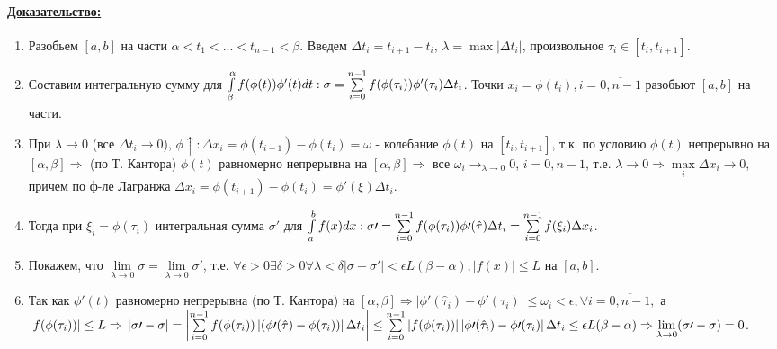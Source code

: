 \documentclass{article}
\begin{document}
	\paragraph{\underline{Доказательство:}}
		\begin{enumerate}

			\item Разобьем $[a,b]$ на части $\alpha<t_1<...<t_{n-1}<\beta$. Введем $\Delta t_i=t_{i+1}-t_i$, $\lambda=\max|\Delta t_i|$, произвольное $\tau_i \in [t_i,t_{i+1}]$.

			\item Составим интегральную сумму для $\int\limits^\alpha_\beta f(\phi(t))\phi^\prime(t)dt: \\
			\sigma=\sum\limits^{n-1}_{i=0}f(\phi(\tau_i))\phi^\prime(\tau_i)\Delta t_i$. Точки $x_i=\phi(t_i), i=\overline{0,n-1}$ разобьют $[a,b]$ на части.

			\item При $\lambda \rightarrow 0$ (все $\Delta t_i \rightarrow 0$), $\phi\uparrow: \Delta x_i=\phi(t_{i+1})-\phi(t_i)=\omega$ - колебание $\phi(t)$ на $[t_i,t_{i+1}]$, т.к. по условию $\phi(t)$ непрерывно на $[\alpha,\beta] \Rightarrow $ (по Т. Кантора) $\phi(t)$ равномерно непрерывна на $[\alpha,\beta] \Rightarrow$ все $\omega_i \rightarrow_{\lambda \rightarrow 0} 0$, $i=\overline{0,n-1}$, т.е. $\lambda \rightarrow 0 \Rightarrow \max\limits_i \Delta x_i \rightarrow 0$, причем по ф-ле Лагранжа $\Delta x_i=\phi(t_{i+1})-\phi(t_i)=\phi\prime(\xi)\Delta t_i$.

			\item Тогда при $\xi_i = \phi(\tau_i)$ интегральная сумма $\sigma\prime$ для $\int\limits^b_af(x)dx: \\
			\sigma\prime=\sum\limits^{n-1}_{i=0}f(\phi(\tau_i))\phi\prime(\hat\tau)\Delta t_i = \sum\limits^{n-1}_{i=0}f(\xi_i)\Delta x_i$.

			\item Покажем, что $\lim\limits_{\lambda \rightarrow 0}\sigma=\lim\limits_{\lambda \rightarrow 0}\sigma\prime$, т.е. $\forall \epsilon>0 \exists\delta>0 \forall\lambda<\delta |\sigma-\sigma\prime|<\epsilon L(\beta-\alpha), |f(x)|\leq L$ на $[a,b]$.

			\item Так как $\phi\prime(t)$ равномерно непрерывна (по Т. Кантора) на $[\alpha,\beta] \Rightarrow \left|\phi\prime(\hat\tau_i)-\phi\prime(\tau_i)\right|\leq\omega_i<\epsilon, \forall i = \overline{0,n-1},$ а $\left|f(\phi(\tau_i))\right| \leq L \Rightarrow \\
			\left|\sigma\prime-\sigma\right| = \left|\sum\limits^{n-1}_{i=0} f(\phi(\tau_i))\left|(\phi\prime(\hat\tau)-\phi(\tau_i))\right|\Delta t_i\right| \leq \sum\limits^{n-1}_{i=0}\left|f(\phi(\tau_i))\right|\left|\phi\prime(\hat\tau_i)-\phi\prime(\tau_i)\right|\Delta t_i \leq \epsilon L(\beta-\alpha) \Rightarrow \lim\limits_{\lambda \rightarrow 0}(\sigma\prime-\sigma) = 0$. 

		\end{enumerate}
\end{document}
